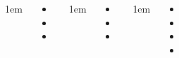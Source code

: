 \documentclass[	20pt, 
							a0paper, 
							landscape,
							margin=0mm, %
							innermargin=10mm,  		%
							blockverticalspace=4mm, %
							colspace=5mm, 
							subcolspace=0mm
							]{tikzposter}
\begin{document}
\begin{columns}

			{
					\setlength{\leftmargini}{4em}
					\setlength{\labelsep} {1em}
				\begin{LARGE}
					\begin{itemize}
					\item 
					\item 
					\item 
					\end{itemize}
				\end{LARGE}
			} %


			{
					\setlength{\leftmargini}{4em}
					\setlength{\labelsep} {1em}
				\begin{LARGE}
					\begin{itemize}
					\item 
					\item 
					\item 
					\end{itemize}
				\end{LARGE}
			} %







			{
					\setlength{\leftmargini}{3em}
					\setlength{\labelsep} {1em}
				\begin{LARGE}
					\begin{itemize}
					\item 
					\item 
					\item 
					\item 
					\end{itemize}
				\end{LARGE}
			} %






	\end{columns}
\end{document}
